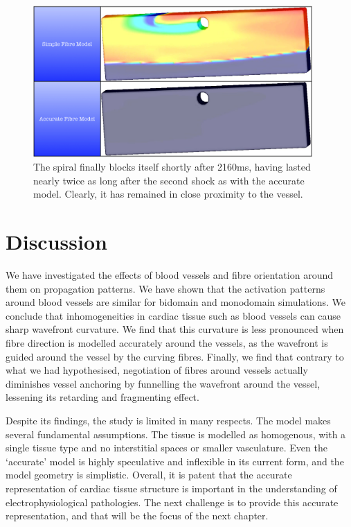    \begin{figure}[htbp]
  		\centering
  	    \includegraphics[width=0.95\textwidth]{Ch4/Figs/shock_induced_2160ms}
              \caption{The spiral finally blocks itself shortly after 2160ms, having lasted nearly twice as long after the second shock as with the accurate model. Clearly, it has remained in close proximity to the vessel.}
  	  \label{fig:shock_induced_2160ms}
  	\end{figure}
      

\section{Discussion} %
\label{sec:discussion}
  We have investigated the effects of blood vessels and fibre orientation around them on propagation patterns. We have shown that the activation patterns around blood vessels are similar for bidomain and monodomain simulations. We conclude that inhomogeneities in cardiac tissue such as blood vessels can cause sharp wavefront curvature. We find that this curvature is less pronounced when fibre direction is modelled accurately around the vessels, as the wavefront is guided around the vessel by the curving fibres. Finally, we find that contrary to what we had hypothesised, negotiation of fibres around vessels actually diminishes vessel anchoring by funnelling the wavefront around the vessel, lessening its retarding and fragmenting effect.

  Despite its findings, the study is limited in many respects. The model makes several fundamental assumptions. The tissue is modelled as homogenous, with a single tissue type and no interstitial spaces or smaller vasculature. Even the ‘accurate’ model is highly speculative and inflexible in its current form, and the model geometry is simplistic. Overall, it is patent that the accurate representation of cardiac tissue structure is important in the understanding of electrophysiological pathologies. The next challenge is to provide this accurate representation, and that will be the focus of the next chapter.

